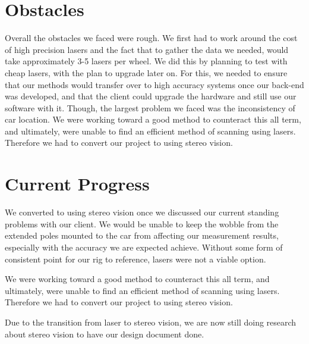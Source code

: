 \documentclass[onecolumn, draftclsnofoot,10pt, compsoc]{IEEEtran}
\begin{document}
\section{Obstacles} Overall the obstacles we faced were rough. We first had to work around the cost of high precision lasers and the fact that to gather the data we needed, would take approximately 3-5 lasers per wheel. We did this by planning to test with cheap lasers, with the plan to upgrade later on. For this, we needed to ensure that our methods would transfer over to high accuracy systems once our back-end was developed, and that the client could upgrade the hardware and still use our software with it. Though, the largest problem we faced was the inconsistency of car location. We were working toward a good method to counteract this all term, and ultimately, were unable to find an efficient method of scanning using lasers. Therefore we had to convert our project to using stereo vision.

\section{Current Progress}
We converted to using stereo vision once we discussed our current standing problems with our client. We would be unable to keep the wobble from the extended poles mounted to the car from affecting our measurement results, especially with the accuracy we are expected achieve. Without some form of consistent point for our rig to reference, lasers were not a viable option.

\noindent We were working toward a good method to counteract this all term, and ultimately, were unable to find an efficient method of scanning using lasers. Therefore we had to convert our project to using stereo vision.

\noindent Due to the transition from laser to stereo vision, we are now still doing research about stereo vision to have our design document done. 

\end{document}
